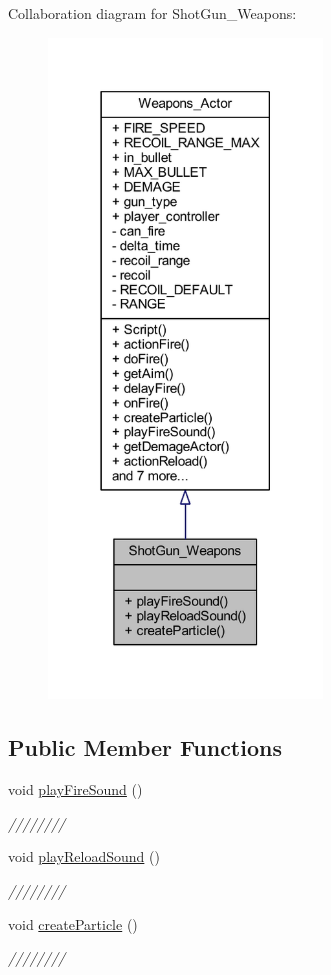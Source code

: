 Collaboration diagram for Shot\+Gun\+\_\+\+Weapons\+:\nopagebreak
\begin{figure}[H]
\begin{center}
\leavevmode
\includegraphics[width=206pt]{class_shot_gun___weapons__coll__graph}
\end{center}
\end{figure}
\subsection*{Public Member Functions}
\begin{DoxyCompactItemize}
\item 
void \hyperlink{class_shot_gun___weapons_a7d6e869ff1721fe45ed1d083d3c98752}{play\+Fire\+Sound} ()
\begin{DoxyCompactList}\small\item\em //////// \end{DoxyCompactList}\item 
void \hyperlink{class_shot_gun___weapons_a5548a633c4937f280bbe86ae30d42a7f}{play\+Reload\+Sound} ()
\begin{DoxyCompactList}\small\item\em //////// \end{DoxyCompactList}\item 
void \hyperlink{class_shot_gun___weapons_a83fd6534381ea7571560904fe16c3a77}{create\+Particle} ()
\begin{DoxyCompactList}\small\item\em //////// \end{DoxyCompactList}\end{DoxyCompactItemize}
